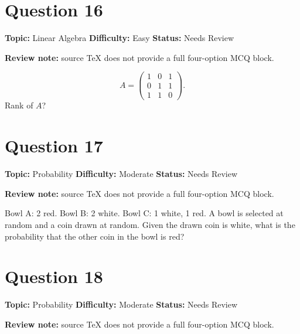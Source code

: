 \documentclass[11pt]{article}
\begin{document}
\newpage

\section*{Question 16}


\noindent\textbf{Topic:} Linear Algebra \quad \textbf{Difficulty:} Easy \quad \textbf{Status:} Needs Review

\par\noindent\textcolor{StatAmber}{\textbf{Review note:} source TeX does not provide a full four-option MCQ block.}


\[
A=\begin{pmatrix}1&0&1\\ 0&1&1\\ 1&1&0\end{pmatrix}.
\]
Rank of $A$?

\newpage

\section*{Question 17}


\noindent\textbf{Topic:} Probability \quad \textbf{Difficulty:} Moderate \quad \textbf{Status:} Needs Review

\par\noindent\textcolor{StatAmber}{\textbf{Review note:} source TeX does not provide a full four-option MCQ block.}


Bowl A: 2 red. Bowl B: 2 white. Bowl C: 1 white, 1 red. A bowl is selected at random and a coin drawn at random. Given the drawn coin is white, what is the probability that the other coin in the bowl is red?

\newpage

\section*{Question 18}


\noindent\textbf{Topic:} Probability \quad \textbf{Difficulty:} Moderate \quad \textbf{Status:} Needs Review

\par\noindent\textcolor{StatAmber}{\textbf{Review note:} source TeX does not provide a full four-option MCQ block.}
\end{document}
